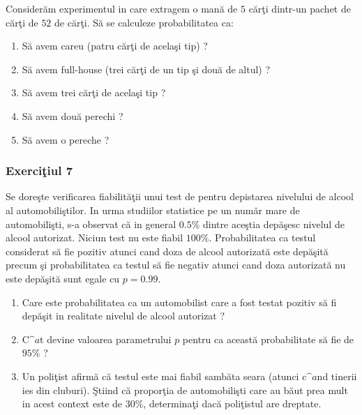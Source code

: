 \documentclass[]{article}
\begin{document}
Consider\u am experimentul in care extragem o man\u a de \(5\)
c\u ar\c ti dintr-un pachet de c\u ar\c ti de \(52\) de c\u ar\c ti.
S\u a se calculeze probabilitatea ca:

\begin{enumerate}
\def\labelenumi{\alph{enumi})}
\item
  S\u a avem careu (patru c\u ar\c ti de acela\c si tip) ?
\item
  S\u a avem full-house (trei c\u ar\c ti de un tip \c si dou\u a de
  altul) ?
\item
  S\u a avem trei c\u ar\c ti de acela\c si tip ?
\item
  S\u a avem dou\u a perechi ?
\item
  S\u a avem o pereche ?
\end{enumerate}

\subsubsection{\texorpdfstring{Exerci\c tiul
7}{Exerciiul 7}}\label{exerciiul-7}

Se dore\c ste verificarea fiabilit\u a\c tii unui test de pentru
depistarea nivelului de alcool al automobili\c stilor. In urma studiilor
statistice pe un num\u ar mare de automobili\c sti, s-a observat c\u a
in general \(0.5\%\) dintre ace\c stia dep\u a\c sesc nivelul de alcool
autorizat. Niciun test nu este fiabil \(100\%\). Probabilitatea ca
testul considerat s\u a fie pozitiv atunci cand doza de alcool
autorizat\u a este dep\u a\c sit\u a precum \c si probabilitatea ca
testul s\u a fie negativ atunci cand doza autorizat\u a nu este
dep\u a\c sit\u a sunt egale cu \(p=0.99\).

\begin{enumerate}
\def\labelenumi{\arabic{enumi}.}
\item
  Care este probabilitatea ca un automobilist care a fost testat pozitiv
  s\u a fi dep\u a\c sit in realitate nivelul de alcool autorizat ?
\item
  C\(\^a\)t devine valoarea parametrului \(p\) pentru ca aceast\u a
  probabilitate s\u a fie de \(95\%\) ?
\item
  Un poli\c tist afirm\u a c\u a testul este mai fiabil samb\u ata seara
  (atunci c\(\^a\)nd tinerii ies din cluburi). \c Stiind c\u a
  propor\c tia de automobili\c sti care au b\u aut prea mult in acest
  context este de \(30\%\), determina\c ti dac\u a poli\c tistul are
  dreptate.
\end{enumerate}
\end{document}
